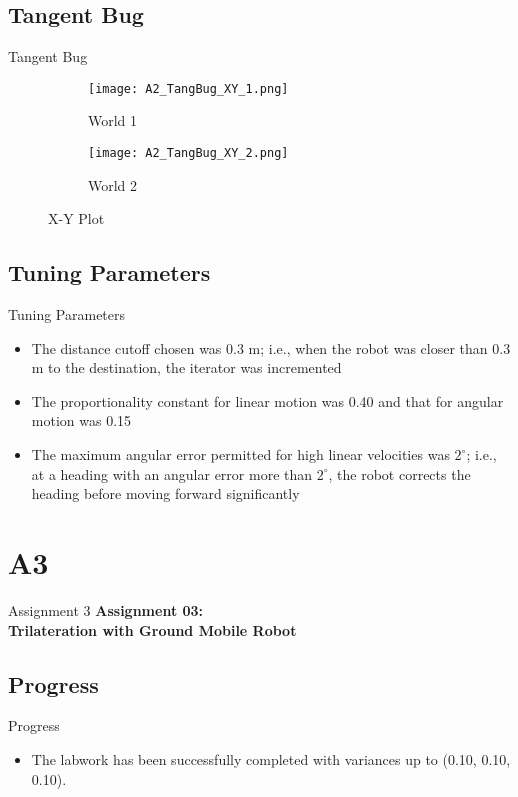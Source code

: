 \documentclass{beamer}
\begin{document}
\subsection{Tangent Bug}
\begin{frame}{Tangent Bug}
\begin{figure}[H]
    \centering
    \begin{subfigure}{\textwidth}
        \centering
        \texttt{[image: A2\_TangBug\_XY\_1.png]}
        \caption{World 1}
    \end{subfigure}
    \begin{subfigure}{\textwidth}
        \centering
        \texttt{[image: A2\_TangBug\_XY\_2.png]}
        \caption{World 2}
    \end{subfigure}
    \caption{X-Y Plot}
\end{figure}
\end{frame}

\subsection{Tuning Parameters}
\begin{frame}{Tuning Parameters}
\begin{itemize}
    \item The distance cutoff chosen was 0.3 m; i.e., when the robot was closer than 0.3 m to the destination, the iterator was incremented
    \item The proportionality constant for linear motion was 0.40 and that for angular motion was 0.15
    \item The maximum angular error permitted for high linear velocities was \(2^\circ\); i.e., at a heading with an angular error more than \(2^\circ\), the robot corrects the heading before moving forward significantly
\end{itemize}
\end{frame}

\section{A3}

\begin{frame}{Assignment 3}
  \centering
  \textbf{Assignment 03:\\Trilateration with Ground Mobile Robot}
\end{frame}

\subsection{Progress}
\begin{frame}{Progress}
\begin{itemize}
    \item The labwork has been successfully completed with variances up to (0.10, 0.10, 0.10).
\end{itemize}
\end{frame}
\end{document}
